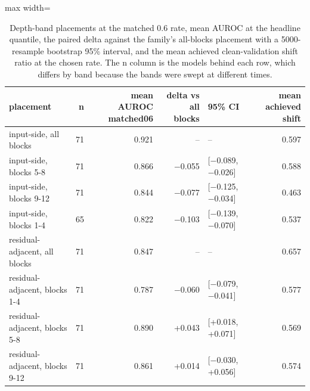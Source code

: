 \begin{table}[htbp]
\centering
\small
\caption{Depth-band placements at the matched 0.6 rate, mean AUROC at the headline quantile, the paired delta against the family's all-blocks placement with a 5000-resample bootstrap 95\% interval, and the mean achieved clean-validation shift ratio at the chosen rate. The n column is the models behind each row, which differs by band because the bands were swept at different times.}
\label{tab:depth-bands}
\begin{adjustbox}{max width=\linewidth}
\begin{tabular}{lrrrlr}
\toprule
placement & n & mean AUROC matched06 & delta vs all blocks & 95\% CI & mean achieved shift \\
\midrule
input-side, all blocks & 71 & 0.921 & -- & -- & 0.597 \\
input-side, blocks 5-8 & 71 & 0.866 & $-$0.055 & [$-$0.089, $-$0.026] & 0.588 \\
input-side, blocks 9-12 & 71 & 0.844 & $-$0.077 & [$-$0.125, $-$0.034] & 0.463 \\
input-side, blocks 1-4 & 65 & 0.822 & $-$0.103 & [$-$0.139, $-$0.070] & 0.537 \\
residual-adjacent, all blocks & 71 & 0.847 & -- & -- & 0.657 \\
residual-adjacent, blocks 1-4 & 71 & 0.787 & $-$0.060 & [$-$0.079, $-$0.041] & 0.577 \\
residual-adjacent, blocks 5-8 & 71 & 0.890 & +0.043 & [+0.018, +0.071] & 0.569 \\
residual-adjacent, blocks 9-12 & 71 & 0.861 & +0.014 & [$-$0.030, +0.056] & 0.574 \\
\bottomrule
\end{tabular}
\end{adjustbox}
\end{table}
